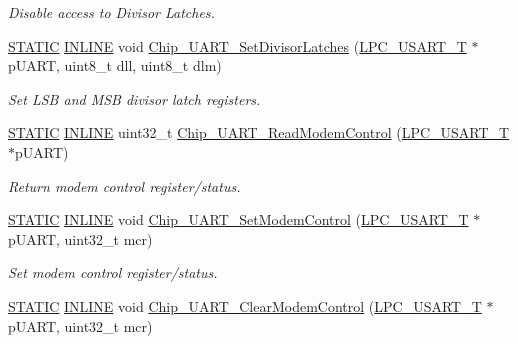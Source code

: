 \begin{DoxyCompactItemize}
\begin{DoxyCompactList}\small\item\em Disable access to Divisor Latches. \end{DoxyCompactList}\item 
\hyperlink{group___l_p_c___types___public___macros_ga10b2d890d871e1489bb02b7e70d9bdfb}{S\+T\+A\+T\+IC} \hyperlink{spifi__18xx__43xx_8h_a2eb6f9e0395b47b8d5e3eeae4fe0c116}{I\+N\+L\+I\+NE} void \hyperlink{group___u_a_r_t__18_x_x__43_x_x_ga267fa73ca52d35a7f60f849727c3d2b6}{Chip\+\_\+\+U\+A\+R\+T\+\_\+\+Set\+Divisor\+Latches} (\hyperlink{struct_l_p_c___u_s_a_r_t___t}{L\+P\+C\+\_\+\+U\+S\+A\+R\+T\+\_\+T} $\ast$p\+U\+A\+RT, uint8\+\_\+t dll, uint8\+\_\+t dlm)
\begin{DoxyCompactList}\small\item\em Set L\+SB and M\+SB divisor latch registers. \end{DoxyCompactList}\item 
\hyperlink{group___l_p_c___types___public___macros_ga10b2d890d871e1489bb02b7e70d9bdfb}{S\+T\+A\+T\+IC} \hyperlink{spifi__18xx__43xx_8h_a2eb6f9e0395b47b8d5e3eeae4fe0c116}{I\+N\+L\+I\+NE} uint32\+\_\+t \hyperlink{group___u_a_r_t__18_x_x__43_x_x_gadef0e0d2ea30182cd99561efe9909707}{Chip\+\_\+\+U\+A\+R\+T\+\_\+\+Read\+Modem\+Control} (\hyperlink{struct_l_p_c___u_s_a_r_t___t}{L\+P\+C\+\_\+\+U\+S\+A\+R\+T\+\_\+T} $\ast$p\+U\+A\+RT)
\begin{DoxyCompactList}\small\item\em Return modem control register/status. \end{DoxyCompactList}\item 
\hyperlink{group___l_p_c___types___public___macros_ga10b2d890d871e1489bb02b7e70d9bdfb}{S\+T\+A\+T\+IC} \hyperlink{spifi__18xx__43xx_8h_a2eb6f9e0395b47b8d5e3eeae4fe0c116}{I\+N\+L\+I\+NE} void \hyperlink{group___u_a_r_t__18_x_x__43_x_x_gad617968b795061ad0e4578aa79c4537d}{Chip\+\_\+\+U\+A\+R\+T\+\_\+\+Set\+Modem\+Control} (\hyperlink{struct_l_p_c___u_s_a_r_t___t}{L\+P\+C\+\_\+\+U\+S\+A\+R\+T\+\_\+T} $\ast$p\+U\+A\+RT, uint32\+\_\+t mcr)
\begin{DoxyCompactList}\small\item\em Set modem control register/status. \end{DoxyCompactList}\item 
\hyperlink{group___l_p_c___types___public___macros_ga10b2d890d871e1489bb02b7e70d9bdfb}{S\+T\+A\+T\+IC} \hyperlink{spifi__18xx__43xx_8h_a2eb6f9e0395b47b8d5e3eeae4fe0c116}{I\+N\+L\+I\+NE} void \hyperlink{group___u_a_r_t__18_x_x__43_x_x_gabdcefa8f847cfa0de2f9292405827874}{Chip\+\_\+\+U\+A\+R\+T\+\_\+\+Clear\+Modem\+Control} (\hyperlink{struct_l_p_c___u_s_a_r_t___t}{L\+P\+C\+\_\+\+U\+S\+A\+R\+T\+\_\+T} $\ast$p\+U\+A\+RT, uint32\+\_\+t mcr)

\end{DoxyCompactItemize}
